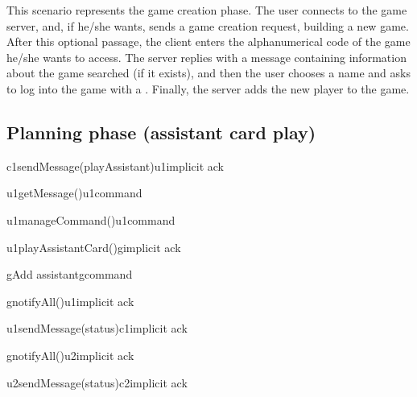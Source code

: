 \documentclass[a4paper]{article}
\begin{document}
	This scenario represents the game creation phase. The user connects to the game server, and, if he/she wants, sends a game creation request, building a new game. After this optional passage, the client enters the alphanumerical code of the game he/she wants to access. The server replies with a message containing information about the game searched (if it exists), and then the user chooses a name and asks to log into the game with a . Finally, the server adds the new player to the game.

	\pagebreak

	\subsection{Planning phase (assistant card play)}

	\begin{center}
		\begin{sequencediagram}

			\begin{call}{c1}{sendMessage(playAssistant)}{u1}{implicit ack}
				\begin{call}{u1}{getMessage()}{u1}{command}
				\end{call}
				\begin{call}{u1}{manageCommand()}{u1}{command}
				\end{call}
				\begin{call}{u1}{playAssistantCard()}{g}{implicit ack}
					\begin{call}{g}{Add assistant}{g}{command}
					\end{call}
					\begin{call}{g}{notifyAll()}{u1}{implicit ack}
						\begin{call}{u1}{sendMessage(status)}{c1}{implicit ack}
						\end{call}
					\end{call}
					\begin{call}{g}{notifyAll()}{u2}{implicit ack}
						\begin{call}{u2}{sendMessage(status)}{c2}{implicit ack}
						\end{call}
					\end{call}
				\end{call}
			\end{call}
		\end{sequencediagram}
	\end{center}
\end{document}
